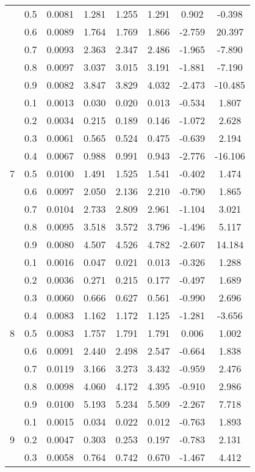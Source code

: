\documentclass[11pt,a4paper]{report}
\begin{document}
\begin{longtable}{ | c | c || c | c | c | c | c | c | }
 & 0.5 & 0.0081 & 1.281 & 1.255 & 1.291 & 0.902 & -0.398 \\
 & 0.6 & 0.0089 & 1.764 & 1.769 & 1.866 & -2.759 & 20.397 \\
 & 0.7 & 0.0093 & 2.363 & 2.347 & 2.486 & -1.965 & -7.890 \\
 & 0.8 & 0.0097 & 3.037 & 3.015 & 3.191 & -1.881 & -7.190 \\
 & 0.9 & 0.0082 & 3.847 & 3.829 & 4.032 & -2.473 & -10.485 \\
 \hline
\multirow{9}{*}{7} & 0.1 & 0.0013 & 0.030 & 0.020 & 0.013 & -0.534 & 1.807 \\
 & 0.2 & 0.0034 & 0.215 & 0.189 & 0.146 & -1.072 & 2.628 \\
 & 0.3 & 0.0061 & 0.565 & 0.524 & 0.475 & -0.639 & 2.194 \\
 & 0.4 & 0.0067 & 0.988 & 0.991 & 0.943 & -2.776 & -16.106 \\
 & 0.5 & 0.0100 & 1.491 & 1.525 & 1.541 & -0.402 & 1.474 \\
 & 0.6 & 0.0097 & 2.050 & 2.136 & 2.210 & -0.790 & 1.865 \\
 & 0.7 & 0.0104 & 2.733 & 2.809 & 2.961 & -1.104 & 3.021 \\
 & 0.8 & 0.0095 & 3.518 & 3.572 & 3.796 & -1.496 & 5.117 \\
 & 0.9 & 0.0080 & 4.507 & 4.526 & 4.782 & -2.607 & 14.184 \\
 \hline
\multirow{9}{*}{8} & 0.1 & 0.0016 & 0.047 & 0.021 & 0.013 & -0.326 & 1.288 \\
 & 0.2 & 0.0036 & 0.271 & 0.215 & 0.177 & -0.497 & 1.689 \\
 & 0.3 & 0.0060 & 0.666 & 0.627 & 0.561 & -0.990 & 2.696 \\
 & 0.4 & 0.0083 & 1.162 & 1.172 & 1.125 & -1.281 & -3.656 \\
 & 0.5 & 0.0083 & 1.757 & 1.791 & 1.791 & 0.006 & 1.002 \\
 & 0.6 & 0.0091 & 2.440 & 2.498 & 2.547 & -0.664 & 1.838 \\
 & 0.7 & 0.0119 & 3.166 & 3.273 & 3.432 & -0.959 & 2.476 \\
 & 0.8 & 0.0098 & 4.060 & 4.172 & 4.395 & -0.910 & 2.986 \\
 & 0.9 & 0.0100 & 5.193 & 5.234 & 5.509 & -2.267 & 7.718 \\
 \hline
\multirow{9}{*}{9} & 0.1 & 0.0015 & 0.034 & 0.022 & 0.012 & -0.763 & 1.893 \\
 & 0.2 & 0.0047 & 0.303 & 0.253 & 0.197 & -0.783 & 2.131 \\
 & 0.3 & 0.0058 & 0.764 & 0.742 & 0.670 & -1.467 & 4.412 \\

\end{longtable}
\end{document}
